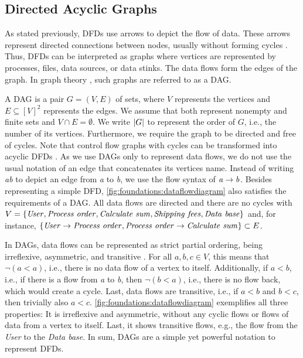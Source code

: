 \subsection{Directed Acyclic Graphs}

As stated previously, \acp{DFD} use arrows to depict the flow of data.
These arrows represent directed connections between nodes, usually without forming cycles \cite{demarco_structure_1979}.
Thus, \acp{DFD} can be interpreted as graphs where vertices are represented by processes, files, data sources, or data stinks.
The data flows form the edges of the graph.
In graph theory \cite{diestel_graph_2017,bang-jensen_digraphs_2009}, such graphs are referred to as a \acf{DAG}.

A \ac{DAG} is a pair $G = (V, E)$ of sets, where $V$ represents the vertices and $E \subseteq [V]^2$ represents the edges.
We assume that both represent nonempty and finite sets and $V \cap E = \emptyset$.
We write $\lvert G\rvert$ to represent the order of $G$, i.e., the number of its vertices.
Furthermore, we require the graph to be directed and free of cycles.
Note that control flow graphs with cycles can be transformed into acyclic \acp{DFD} \cite{kramer_combining_1994}.
As we use \acp{DAG} only to represent data flows, we do not use the usual notation of an edge that concatenates its vertices name.
Instead of writing \emph{ab} to depict an edge from \emph{a} to \emph{b}, we use the flow syntax of $\mathit{a} \rightarrow \mathit{b}$.
Besides representing a simple \ac{DFD}, \autoref{fig:foundations:dataflowdiagram} also satisfies the requirements of a \ac{DAG}.
All data flows are directed and there are no cycles with $V = \{ \mathit{User}, \mathit{Process~order}, \mathit{Calculate~sum}, \mathit{Shipping~fees}, \mathit{Data~base} \}$ and, for instance, $\{ \mathit{User} \rightarrow \mathit{Process~order}, \mathit{Process~order} \rightarrow \mathit{Calculate~sum} \} \subset E$.

In \acp{DAG}, data flows can be represented as strict partial ordering, being irreflexive, asymmetric, and transitive \cite{knuth_art_1997}.
For all $a,b,c \in V$, this means that $\neg (a < a)$, i.e., there is no data flow of a vertex to itself.
Additionally, if $a < b$, i.e., if there is a flow from \emph{a} to \emph{b}, then $\neg (b < a)$, i.e., there is no flow back, which would create a cycle.
Last, data flows are transitive, i.e., if $a < b$ and $b < c$, then trivially also $a < c$.
\autoref{fig:foundations:dataflowdiagram} exemplifies all three properties:
It is irreflexive and asymmetric, without any cyclic flows or flows of data from a vertex to itself.
Last, it shows transitive flows, e.g., the flow from the \emph{User} to the \emph{Data base}.
In sum, \acp{DAG} are a simple yet powerful notation to represent \acp{DFD}.





